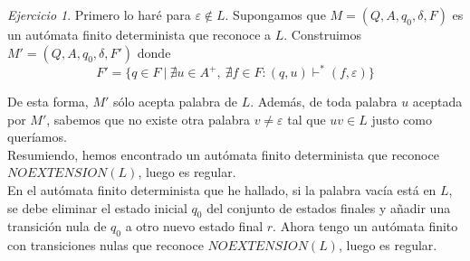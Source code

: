 \documentclass[12pt,spanish]{article}
\theoremstyle{definition}
\theoremstyle{remark}
\newtheorem{exercise}{Ejercicio}%
\begin{document}
\begin{exercise}
Primero lo haré para $\varepsilon \notin L$.
  Supongamos que $M=(Q,A,q_0,\delta,F)$ es un autómata finito
determinista que reconoce a $L$. Construimos $M'=(Q,A,q_0,\delta,F')$
donde
  \[F'=\{q\in F \ | \ \nexists u \in A^+, \ \nexists f \in F :
(q,u)\vdash^* (f,\varepsilon)\}\]

De esta forma, $M'$ sólo acepta palabra de $L$. Además, de toda
palabra $u$ aceptada por $M'$, sabemos que no existe otra palabra $v
\neq \varepsilon$ tal que $uv \in L$ justo como queríamos. \\

  Resumiendo, hemos encontrado un autómata finito determinista que
reconoce $NOEXTENSION(L)$, luego es regular. \\

En el autómata finito determinista que he hallado, si la palabra vacía
está en $L$, se debe eliminar el estado inicial $q_0$ del conjunto de
estados finales y añadir una transición nula de $q_0$ a otro nuevo
estado final $r$. Ahora tengo un autómata finito con transiciones
nulas que reconoce $NOEXTENSION(L)$, luego es regular.
\end{exercise}
~
\end{document}
